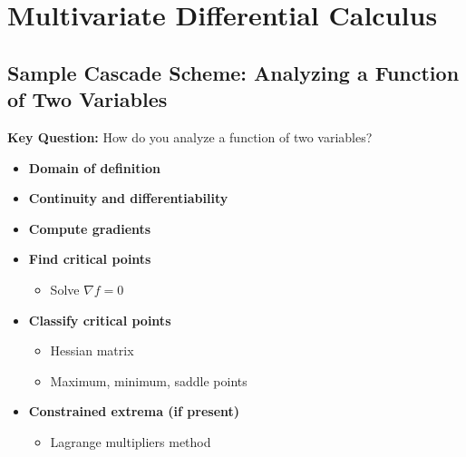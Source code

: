 \section{Multivariate Differential Calculus}

\subsection*{Sample Cascade Scheme: Analyzing a Function of Two Variables}

\begin{cascade}
	\textbf{Key Question:} How do you analyze a function of two variables?
	\begin{itemize}
		\item \textbf{Domain of definition}
		\item \textbf{Continuity and differentiability}
		\item \textbf{Compute gradients}
		\item \textbf{Find critical points}
		      \begin{itemize}
			      \item Solve $\nabla f = 0$
		      \end{itemize}
		\item \textbf{Classify critical points}
		      \begin{itemize}
			      \item Hessian matrix
			      \item Maximum, minimum, saddle points
		      \end{itemize}
		\item \textbf{Constrained extrema (if present)}
		      \begin{itemize}
			      \item Lagrange multipliers method
		      \end{itemize}
	\end{itemize}
\end{cascade}

